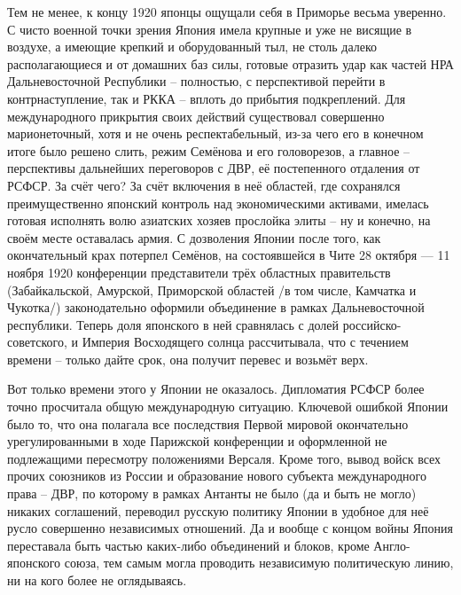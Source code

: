 Тем не менее, к концу 1920 японцы ощущали себя в Приморье весьма уверенно. С чисто военной точки зрения Япония имела крупные и уже не висящие в воздухе, а имеющие крепкий и оборудованный тыл, не столь далеко располагающиеся и от домашних баз силы, готовые отразить удар как частей НРА Дальневосточной Республики – полностью, с перспективой перейти в контрнаступление, так и РККА – вплоть до прибытия подкреплений. Для международного прикрытия своих действий существовал совершенно марионеточный, хотя и не очень респектабельный, из-за чего его в конечном итоге было решено слить, режим Семёнова и его головорезов, а главное – перспективы дальнейших переговоров с ДВР, её постепенного отдаления от РСФСР. За счёт чего? За счёт включения в неё областей, где сохранялся преимущественно японский контроль над экономическими активами, имелась готовая исполнять волю азиатских хозяев прослойка элиты – ну и конечно, на своём месте оставалась армия. С дозволения Японии после того, как окончательный крах потерпел Семёнов, на состоявшейся в Чите 28 октября — 11 ноября 1920 конференции представители трёх областных правительств (Забайкальской, Амурской, Приморской областей /в том числе, Камчатка и Чукотка/) законодательно оформили объединение в рамках Дальневосточной республики. Теперь доля японского в ней сравнялась с долей российско-советского, и Империя Восходящего солнца рассчитывала, что с течением времени – только дайте срок, она получит перевес и возьмёт верх.

Вот только времени этого у Японии не оказалось. Дипломатия РСФСР более точно просчитала общую международную ситуацию. Ключевой ошибкой Японии было то, что она полагала все последствия Первой мировой окончательно урегулированными в ходе Парижской конференции и оформленной не подлежащими пересмотру положениями Версаля. Кроме того, вывод войск всех прочих союзников из России и образование нового субъекта международного права – ДВР, по которому в рамках Антанты не было (да и быть не могло) никаких соглашений, переводил русскую политику Японии в удобное для неё русло совершенно независимых отношений. Да и вообще с концом войны Япония переставала быть частью каких-либо объединений и блоков, кроме Англо-японского союза, тем самым могла проводить независимую политическую линию, ни на кого более не оглядываясь.

